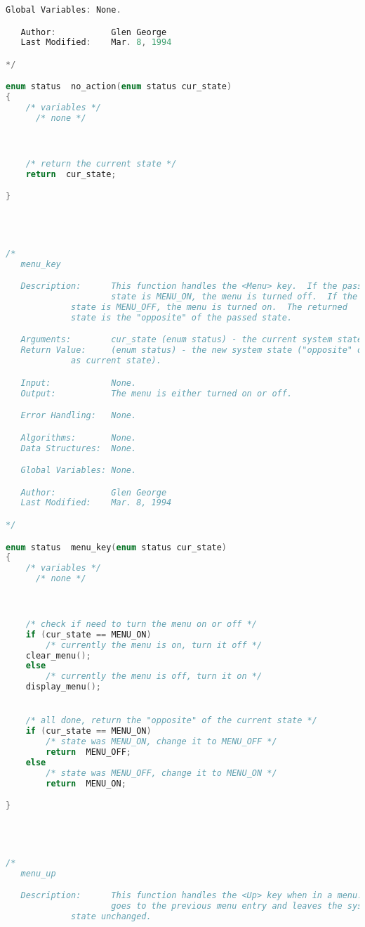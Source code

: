 \begin{lstlisting}[language=C]
   Global Variables: None.

   Author:           Glen George
   Last Modified:    Mar. 8, 1994

*/

enum status  no_action(enum status cur_state)
{
    /* variables */
      /* none */



    /* return the current state */
    return  cur_state;

}




/*
   menu_key

   Description:      This function handles the <Menu> key.  If the passed
                     state is MENU_ON, the menu is turned off.  If the passed
		     state is MENU_OFF, the menu is turned on.  The returned
		     state is the "opposite" of the passed state.

   Arguments:        cur_state (enum status) - the current system state.
   Return Value:     (enum status) - the new system state ("opposite" of the
   		     as current state).

   Input:            None.
   Output:           The menu is either turned on or off.

   Error Handling:   None.

   Algorithms:       None.
   Data Structures:  None.

   Global Variables: None.

   Author:           Glen George
   Last Modified:    Mar. 8, 1994

*/

enum status  menu_key(enum status cur_state)
{
    /* variables */
      /* none */



    /* check if need to turn the menu on or off */
    if (cur_state == MENU_ON)
        /* currently the menu is on, turn it off */
	clear_menu();
    else
        /* currently the menu is off, turn it on */
	display_menu();


    /* all done, return the "opposite" of the current state */
    if (cur_state == MENU_ON)
        /* state was MENU_ON, change it to MENU_OFF */
        return  MENU_OFF;
    else
        /* state was MENU_OFF, change it to MENU_ON */
        return  MENU_ON;

}




/*
   menu_up

   Description:      This function handles the <Up> key when in a menu.  It
                     goes to the previous menu entry and leaves the system
		     state unchanged.


\end{lstlisting}
